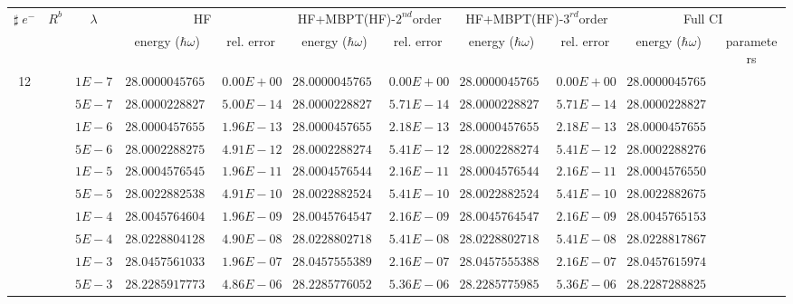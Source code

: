 \begin{landscape}
\begin{table}[ht]
\centering      %
{\tiny
\begin{tabular}[c]{c|c|c|c|c|c|c|c|c|c|c} 
\toprule[1pt]
\multicolumn{1}{c|}{$\sharp \; e^{-}$}  & \multicolumn{1}{c|}{$R^b$} & \multicolumn{1}{c|}{$\lambda$} & \multicolumn{2}{c|}{HF}& \multicolumn{2}{c|}{HF+MBPT(HF)-$2^{nd}$order}& \multicolumn{2}{c|}{HF+MBPT(HF)-$3^{rd}$order}& \multicolumn{2}{c}{Full CI}\\
\multicolumn{1}{c|}{}  & \multicolumn{1}{c|}{} & \multicolumn{1}{c|}{} & \multicolumn{1}{c|}{energy ($\hbar \omega$)}& \multicolumn{1}{c|}{rel. error} & \multicolumn{1}{c|}{energy ($\hbar \omega$)}& \multicolumn{1}{c|}{rel. error}& \multicolumn{1}{c|}{energy ($\hbar \omega$)} &\multicolumn{1}{c|}{rel. error}& \multicolumn{1}{c|}{energy ($\hbar \omega$)}& \multicolumn{1}{c}{parameters}\\
\hline
\multirow{56}{*}{12} & &$1E-7$ & $28.000004576555$ & $0.00E+00$ & $28.000004576555$ & $0.00E+00$ & $28.000004576555$ & $0.00E+00$ & $28.000004576555$ &  \\
& &$5E-7$ & $28.000022882772$ & $5.00E-14$ & $28.000022882772$ & $5.71E-14$ & $28.000022882772$ & $5.71E-14$ & $28.000022882774$ &  \\
& &$1E-6$ & $28.000045765540$ & $1.96E-13$ & $28.000045765539$ & $2.18E-13$ & $28.000045765539$ & $2.18E-13$ & $28.000045765545$ &  \\
& &$5E-6$ & $28.000228827509$ & $4.91E-12$ & $28.000228827495$ & $5.41E-12$ & $28.000228827495$ & $5.41E-12$ & $28.000228827646$ &  \\
& &$1E-5$ & $28.000457654546$ & $1.96E-11$ & $28.000457654489$ & $2.16E-11$ & $28.000457654489$ & $2.16E-11$ & $28.000457655095$ &  \\
& &$5E-5$ & $28.002288253834$ & $4.91E-10$ & $28.002288252424$ & $5.41E-10$ & $28.002288252424$ & $5.41E-10$ & $28.002288267575$ &  \\
& &$1E-4$ & $28.004576460432$ & $1.96E-09$ & $28.004576454794$ & $2.16E-09$ & $28.004576454794$ & $2.16E-09$ & $28.004576515396$ &  \\
& &$5E-4$ & $28.022880412872$ & $4.90E-08$ & $28.022880271860$ & $5.41E-08$ & $28.022880271853$ & $5.41E-08$ & $28.022881786724$ &  \\
& &$1E-3$ & $28.045756103306$ & $1.96E-07$ & $28.045755538941$ & $2.16E-07$ & $28.045755538888$ & $2.16E-07$ & $28.045761597478$ &  \\
& &$5E-3$ & $28.228591777300$ & $4.86E-06$ & $28.228577605242$ & $5.36E-06$ & $28.228577598505$ & $5.36E-06$ & $28.228728882585$ &  \\

\end{tabular}}
\end{table}
\end{landscape}
